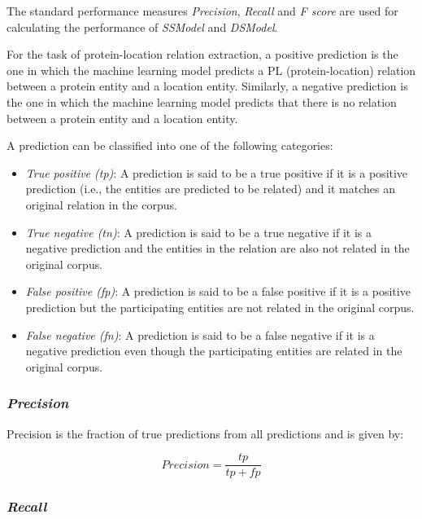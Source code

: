 The standard performance measures \textit{Precision}, \textit{Recall} and \textit{F score} are used for calculating the performance of \textit{SSModel} and \textit{DSModel}.

For the task of protein-location relation extraction, a positive prediction is the one in which the machine learning model predicts a PL (protein-location) relation between a protein entity and a location entity. Similarly, a negative prediction is the one in which the machine learning model predicts that there is no relation between a protein entity and a location entity.

A prediction can be classified into one of the following categories:


\begin{itemize}

\item \textit{True positive (tp)}: A prediction is said to be a true positive if it is a positive prediction (i.e., the entities are predicted to be related) and it matches an original relation in the corpus.

\item \textit{True negative (tn)}: A prediction is said to be a true negative if it is a negative prediction and the entities in the relation are also not related in the original corpus.

\item \textit{False positive (fp)}: A prediction is said to be a false positive if it is a positive prediction but the participating entities are not related in the original corpus.

\item \textit{False negative (fn)}: A prediction is said to be a false negative if it is a negative prediction even though the participating entities are related in the original corpus.

\end{itemize}

\subsubsection*{\textit{Precision}}\label{subsubsec:Prec}

Precision is the fraction of true predictions from all predictions and is given by:

$$
\textit{Precision} = \frac{tp}{tp+fp}
$$


\subsubsection*{\textit{Recall}}\label{subsubsec:Recal}

